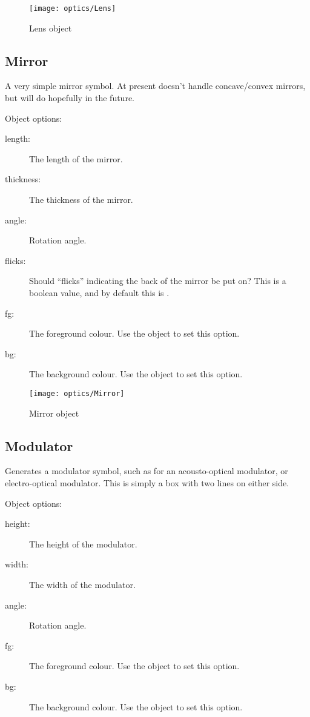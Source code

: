 \begin{figure}[ht]
\centerline{\texttt{[image: optics/Lens]}}
\caption{Lens object}
\label{fig:lens}
\end{figure}

\subsection{Mirror}

A very simple mirror symbol.  At present doesn't handle concave/convex
mirrors, but will do hopefully in the future.

Object options:
\begin{description}
\item[length:] The length of the mirror.
\item[thickness:] The thickness of the mirror.
\item[angle:] Rotation angle.
\item[flicks:] Should ``flicks'' indicating the back of the mirror be put
on?  This is a boolean value, and by default this is .
\item[fg:] The foreground colour.  Use the  object to set this
option.
\item[bg:] The background colour.  Use the  object to set this
option.
\end{description}

\begin{figure}[ht]
\centerline{\texttt{[image: optics/Mirror]}}
\caption{Mirror object}
\label{fig:mirror}
\end{figure}

\subsection{Modulator}

Generates a modulator symbol, such as for an acousto-optical modulator, or
electro-optical modulator.  This is simply a box with two lines on either
side.

Object options:
\begin{description}
\item[height:] The height of the modulator.
\item[width:] The width of the modulator.
\item[angle:] Rotation angle.
\item[fg:] The foreground colour.  Use the  object to set this
option.
\item[bg:] The background colour.  Use the  object to set this
option.
\end{description}

